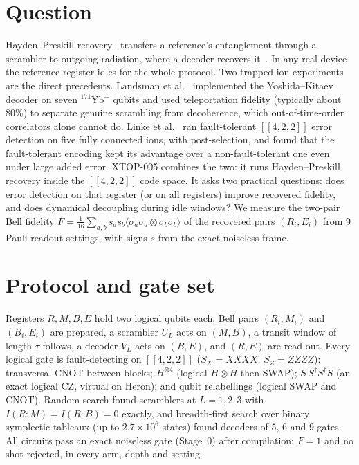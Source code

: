 \documentclass[10pt,twocolumn]{article}
\begin{document}
\section{Question}
Hayden--Preskill recovery~\cite{hp} transfers a reference's entanglement through a scrambler to
outgoing radiation, where a decoder recovers it~\cite{yk}. In any real device the reference register idles for
the whole protocol. Two trapped-ion experiments are the direct precedents. Landsman et al.~\cite{landsman}
implemented the Yoshida--Kitaev decoder on seven $^{171}$Yb$^+$ qubits and used teleportation fidelity
(typically about 80\%) to separate genuine scrambling from decoherence, which out-of-time-order
correlators alone cannot do. Linke et al.~\cite{linke17} ran fault-tolerant $[[4,2,2]]$ error detection on
five fully connected ions, with post-selection, and found that the fault-tolerant encoding kept its
advantage over a non-fault-tolerant one even under large added error. XTOP-005 combines the two: it runs
Hayden--Preskill recovery inside the $[[4,2,2]]$ code space. It asks two practical questions: does error detection on that register (or
on all registers) improve recovered fidelity, and does dynamical decoupling during idle windows? We
measure the two-pair Bell fidelity $F=\tfrac1{16}\sum_{a,b} s_a s_b\langle\sigma_a\sigma_a\otimes
\sigma_b\sigma_b\rangle$ of the recovered pairs $(R_i,E_i)$ from 9 Pauli readout settings, with signs
$s$ from the exact noiseless frame.

\section{Protocol and gate set}
Registers $R,M,B,E$ hold two logical qubits each. Bell pairs $(R_i,M_i)$ and $(B_i,E_i)$ are prepared,
a scrambler $U_L$ acts on $(M,B)$, a transit window of length $\tau$ follows, a decoder $V_L$ acts on
$(B,E)$, and $(R,E)$ are read out. Every logical gate is fault-detecting on $[[4,2,2]]$
($S_X=XXXX$, $S_Z=ZZZZ$): transversal CNOT between blocks; $H^{\otimes4}$ (logical $H\otimes H$ then
SWAP); $S\,S^\dagger S^\dagger S$ (an exact logical CZ, virtual on Heron); and qubit relabellings
(logical SWAP and CNOT). Random search found scramblers at $L=1,2,3$ with
$I(R{:}M)=I(R{:}B)=0$ exactly, and breadth-first search over binary symplectic tableaux (up to
$2.7\times10^6$ states) found decoders of 5, 6 and 9 gates. All circuits pass an exact noiseless gate
(Stage~0) after compilation: $F=1$ and no shot rejected, in every arm, depth and setting.
\end{document}
